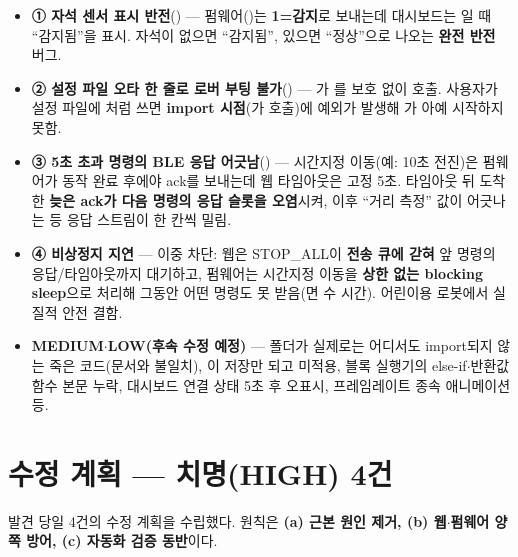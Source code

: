\smallskip
{}

\begin{itemize}
  \item \textbf{① 자석 센서 표시 반전}() — 펌웨어()는
  \textbf{1=감지}로 보내는데 대시보드는 일 때 ``감지됨''을 표시. 자석이 없으면
  ``감지됨'', 있으면 ``정상''으로 나오는 \textbf{완전 반전} 버그.
  \item \textbf{② 설정 파일 오타 한 줄로 로버 부팅 불가}() —
  가 를 보호 없이 호출. 사용자가 설정 파일에
  처럼 쓰면 \textbf{import 시점}(가 호출)에 예외가 발생해
  가 아예 시작하지 못함.
  \item \textbf{③ 5초 초과 명령의 BLE 응답 어긋남}() — 시간지정 이동(예:
  10초 전진)은 펌웨어가 동작 완료 후에야 ack를 보내는데 웹 타임아웃은 고정 5초. 타임아웃 뒤
  도착한 \textbf{늦은 ack가 다음 명령의 응답 슬롯을 오염}시켜, 이후 ``거리 측정'' 값이 어긋나는 등
  응답 스트림이 한 칸씩 밀림.
  \item \textbf{④ 비상정지 지연} — 이중 차단: 웹은 STOP\_ALL이 \textbf{전송 큐에 갇혀} 앞 명령의
  응답/타임아웃까지 대기하고, 펌웨어는 시간지정 이동을 \textbf{상한 없는 blocking sleep}으로 처리해
  그동안 어떤 명령도 못 받음(면 수 시간). 어린이용 로봇에서 실질적 안전 결함.
  \item \textbf{MEDIUM$\cdot$LOW(후속 수정 예정)} —  폴더가 실제로는 어디서도
  import되지 않는 죽은 코드(문서와 불일치), 이 저장만 되고 미적용, 블록 실행기의
  else-if$\cdot$반환값 함수 본문 누락, 대시보드 연결 상태 5초 후 오표시, 프레임레이트 종속
  애니메이션 등.
\end{itemize}

\section{수정 계획 — 치명(HIGH) 4건}
발견 당일 4건의 수정 계획을 수립했다. 원칙은 \textbf{(a) 근본 원인 제거, (b) 웹$\cdot$펌웨어 양쪽
방어, (c) 자동화 검증 동반}이다.

